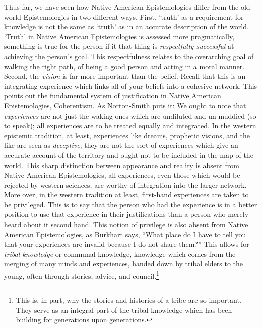 Thus far, we have seen how Native American Epistemologies differ from the old world Epistemologies in two different ways. First, `truth' as a requirement for knowledge is not the same as `truth' as in an accurate description of the world. `Truth' in Native American Epistemologies is assessed more pragmatically, something is true for the person if it that thing is \emph{respectfully successful} at achieving the person's goal. This respectfulness relates to the overarching goal of walking the right path, of being a good person and acting in a moral manner. Second, the \emph{vision} is far more important than the belief. Recall that this is an integrating experience which links all of your beliefs into a cohesive network. This points out the fundamental system of justification in Native American Epistemologies, Coherentism. As Norton-Smith puts it: 
We ought to note that \emph{experiences} are not just the waking ones which are undiluted and un-muddied (so to speak); all experiences are to be treated equally and integrated. In the western epistemic tradition, at least, experiences like dreams, prophetic visions, and the like are seen as \emph{deceptive};\autocite[71]{NortonSmith1} they are not the sort of experiences which give an accurate account of the territory and ought not to be included in the map of the world. This sharp distinction between appearance and reality is absent from Native American Epistemologies, all experiences, even those which would be rejected by western sciences, are worthy of integration into the larger network. More over, in the western tradition at least, first-hand experiences are taken to be privileged. This is to say that the person who had the experience is in a better position to use that experience in their justifications than a person who merely heard about it second hand. This notion of privilege is also absent from Native American Epistemologies, as Burkhart says, ``What place do I have to tell you that your experiences are invalid because I do not share them?''\autocite[26]{Burkhart1} This allows for \emph{tribal knowledge} or communal knowledge, knowledge which comes from the merging of many minds and experiences, handed down by tribal elders to the young, often through stories, advice, and council.\footnote{This is, in part, why the stories and histories of a tribe are so important. They serve as an integral part of the tribal knowledge which has been building for generations upon generations.}


